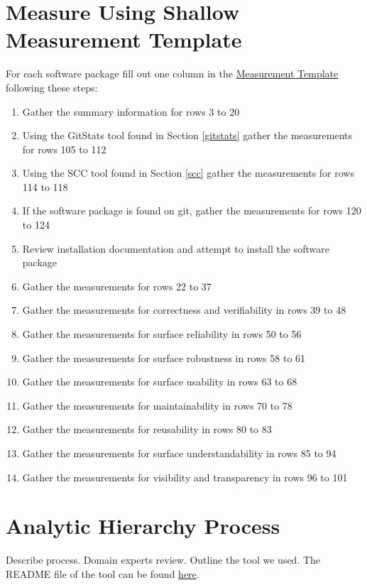 \documentclass[letterpaper,cleveref]{lipics-v2019}
\theoremstyle{definition}
\begin{document}
\section{Measure Using Shallow Measurement Template} \label{SecShallowMeasure}
For each software package fill out one column in the \href{run:Combined_MeasurementTemplate_EmpiricalMeasures.xlsx}{Measurement Template} following these steps:
\begin{enumerate}
	\item Gather the summary information for rows 3 to 20
	\item Using the GitStats tool found in Section \ref{gitstats} gather the measurements for rows 105 to 112
	\item Using the SCC tool found in Section \ref{scc} gather the measurements for rows 114 to 118
	\item If the software package is found on git, gather the measurements for rows 120 to 124
	\item Review installation documentation and attempt to install the software package
	\item Gather the measurements for rows 22 to 37
	\item Gather the measurements for correctness and verifiability in rows 39 to 48
	\item Gather the measurements for surface reliability in rows 50 to 56
	\item Gather the measurements for surface robustness in rows 58 to 61
	\item Gather the measurements for surface usability in rows 63 to 68
	\item Gather the measurements for maintainability in rows 70 to 78
	\item Gather the measurements for reusability in rows 80 to 83
	\item Gather the measurements for surface understandability in rows 85 to 94
	\item Gather the measurements for visibility and transparency in rows 96 to 101
\end{enumerate}

\section{Analytic Hierarchy Process} \label{SecAHP}

Describe process. Domain experts review. Outline the tool we used. The README file of the tool can be found \href{run:../AHP2020/LBM/README.txt}{here}.
\end{document}
